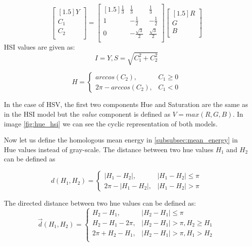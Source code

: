 \begin{equation}
\begin{bmatrix} [1.5]
Y\\
C_1\\
C_2\\
\end{bmatrix}
=
\begin{bmatrix} [1.5]
\frac{1}{3}& \frac{1}{3} & \frac{1}{3} \\
1 & -\frac{1}{2}& -\frac{1}{2} \\
0 &-\frac{\sqrt{3}}{2}& \frac{\sqrt{3}}{2} \\
\end{bmatrix}
\begin{bmatrix} [1.5]
R\\
G\\
B\\
\end{bmatrix}
\end{equation}
HSI values are given as:
\begin{equation}
	I=Y, S=\sqrt{C_1^2+C_2^2}
\end{equation}

\begin{equation}
H=
\begin{cases}
arccos(C_2), & C_1 \geq 0 \\
2\pi-arccos(C_2) , & C_1 < 0
\end{cases}
\end{equation}

In the case of HSV, the first two components Hue and Saturation are the same as in the HSI model but the \textit{value} component is defined as $V = max(R,G,B)$. In image \ref{fig:hue_hsi} we can see the cyclic representation of both models.

Now let us define the homologous mean energy in \ref{subsubsec:mean_energy} in Hue values instead of gray-scale.
The distance between two hue values $H_1$ and $H_2$ can be defined as 

\begin{equation}
d(H_1,H_2) =
\begin{cases}
\mid H_1 - H_2 \mid, & \mid H_1 - H_2 \mid \leq \pi \\
2\pi-\mid H_1 - H_2 \mid, & \mid H_1 - H_2 \mid > \pi
\end{cases}
\end{equation}


The directed distance between two hue values can be defined as:
\begin{equation}
\vec{d}(H_1,H_2) =
\begin{cases}
H_2 - H_1 , & \mid H_2 - H_1 \mid \leq \pi \\
H_2 - H_1 - 2\pi, & \mid H_2 - H_1 \mid > \pi, H_2\geq H_1 \\
2\pi +H_2 - H_1, & \mid H_2 - H_1 \mid > \pi, H_1 > H_2\\
\end{cases}
\end{equation}


